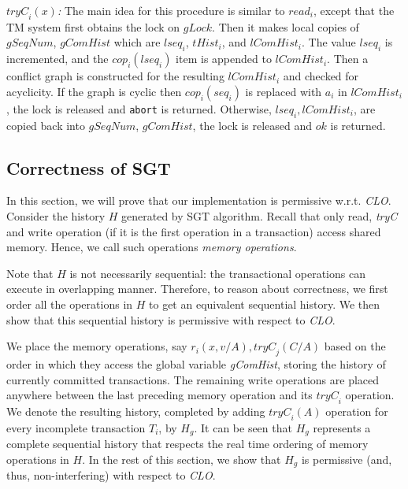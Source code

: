 \documentclass{llncs}
\newcommand{\op} {operation}
\newcommand{\clo} {\textit{CLO}}
\newcommand{\svsls} {\textit{CLO}}
\newcommand{\gchist} {\textit{gComHist}}
\newcommand{\lchist} {\textit{lComHist}}
\newcommand{\thist} {\textit{tHist}}
\newcommand{\gchlock} {\textit{gLock}}
\newcommand{\gseqn}{\textit{gSeqNum}}
\newcommand{\lseq} {\textit{lseq}}
\newcommand{\tryc} {\textit{tryC}}
\newcommand{\cop} {\textit{cop}}
\newcommand{\sgt} {SGT}
\newcommand{\memop} {memory operation}
\begin{document}
\vspace{1mm}
\noindent
\textit{$\tryc_i(x)$:} The main idea for this procedure is similar to
$read_i$, except that the TM system first obtains the lock on
$\gchlock$. Then it makes local copies of $\gseqn$, $\gchist{}$ which are
$\lseq_i$, $\thist_i$, and $\lchist_i$. The value $\lseq_i$ is
incremented, and the $\cop_i(\lseq_i)$ item is appended to $\lchist_i$.
Then a conflict graph is constructed for the resulting $\lchist_i$ 
and checked for acyclicity. If the graph is cyclic then
$\cop_i(seq_i)$ is replaced with $a_i$ in $\lchist_i$, 
the lock is released and \texttt{abort} is returned. 
Otherwise,  $\lseq_i, \lchist_i$, are copied back into $\gseqn$,
$\gchist{}$, the lock is released and $ok$ is returned. \\




\subsection{Correctness of \sgt{}}
\label{subsec:proof}

In this section, we will prove that our implementation is permissive w.r.t. \svsls. 
Consider the history $H$ generated by \sgt{} algorithm. 
Recall that only read, \tryc{} and write \op{} (if it is the
first operation in a transaction) access shared memory. 
Hence, we call such operations  \emph{\memop{s}}. 

Note that $H$ is not necessarily sequential:
the transactional \op{s} can execute in overlapping manner. 
Therefore, to reason about correctness, we first
order all the \op{s} in $H$ to get an equivalent sequential
history. We then show that this sequential history is permissive with
respect to \clo.

We place the \memop{s}, say $r_i(x, v/A), \tryc_j(C/A)$ based on the
order in which they access  the global variable \gchist, storing the
history of currently committed transactions. 
The remaining write \op{s} are placed anywhere 
between the last preceding \memop{} and its $\tryc_i$ \op. 
We denote the resulting history, completed by adding 
$\tryc_i(A)$ \op{} for every incomplete transaction $T_i$, 
by $H_g$. 
It can be seen that $H_g$ represents a complete sequential
history that 
respects the real time ordering of memory operations in $H$.
In the rest of this section, we show that $H_g$ is permissive
(and, thus, non-interfering) with respect to \clo. 
\end{document}
